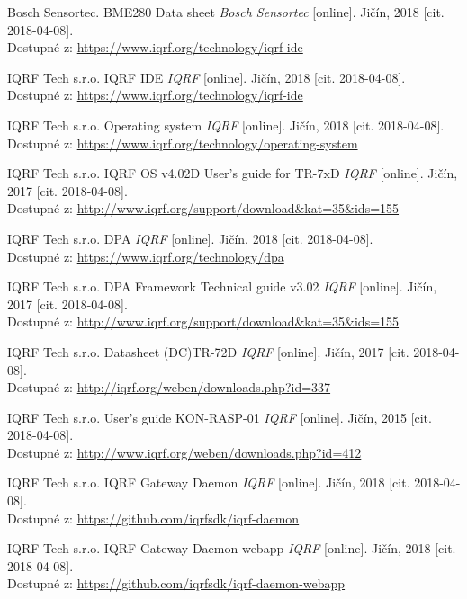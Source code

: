 \documentclass[12pt,a4paper]{article}
\begin{document}
\begin{thebibliography}{99}


Bosch Sensortec. BME280 Data sheet \emph{Bosch Sensortec} [online]. Jičín, 2018 [cit. 2018-04-08]. \\ Dostupné z: \url{https://www.iqrf.org/technology/iqrf-ide}

IQRF Tech s.r.o. IQRF IDE \emph{IQRF} [online]. Jičín, 2018 [cit. 2018-04-08]. \\ Dostupné z: \url{https://www.iqrf.org/technology/iqrf-ide}

IQRF Tech s.r.o. Operating system \emph{IQRF} [online]. Jičín, 2018 [cit. 2018-04-08]. \\ Dostupné z: \url{https://www.iqrf.org/technology/operating-system}

IQRF Tech s.r.o. IQRF OS v4.02D User's guide for TR-7xD \emph{IQRF} [online]. Jičín, 2017 [cit. 2018-04-08]. \\ Dostupné z: \url{http://www.iqrf.org/support/download&kat=35&ids=155}

IQRF Tech s.r.o. DPA \emph{IQRF} [online]. Jičín, 2018 [cit. 2018-04-08]. \\ Dostupné z: \url{https://www.iqrf.org/technology/dpa}

IQRF Tech s.r.o. DPA Framework Technical guide v3.02 \emph{IQRF} [online]. Jičín, 2017 [cit. 2018-04-08]. \\ Dostupné z: \url{http://www.iqrf.org/support/download&kat=35&ids=155}

IQRF Tech s.r.o. Datasheet (DC)TR-72D \emph{IQRF} [online]. Jičín, 2017 [cit. 2018-04-08]. \\ Dostupné z: \url{http://iqrf.org/weben/downloads.php?id=337}

IQRF Tech s.r.o. User's guide KON-RASP-01 \emph{IQRF} [online]. Jičín, 2015 [cit. 2018-04-08]. \\ Dostupné z: \url{http://www.iqrf.org/weben/downloads.php?id=412}

IQRF Tech s.r.o. IQRF Gateway Daemon \emph{IQRF} [online]. Jičín, 2018 [cit. 2018-04-08]. \\ Dostupné z: \url{https://github.com/iqrfsdk/iqrf-daemon}

IQRF Tech s.r.o. IQRF Gateway Daemon webapp \emph{IQRF} [online]. Jičín, 2018 [cit. 2018-04-08]. \\ Dostupné z: \url{https://github.com/iqrfsdk/iqrf-daemon-webapp}


\end{thebibliography}
\end{document}
